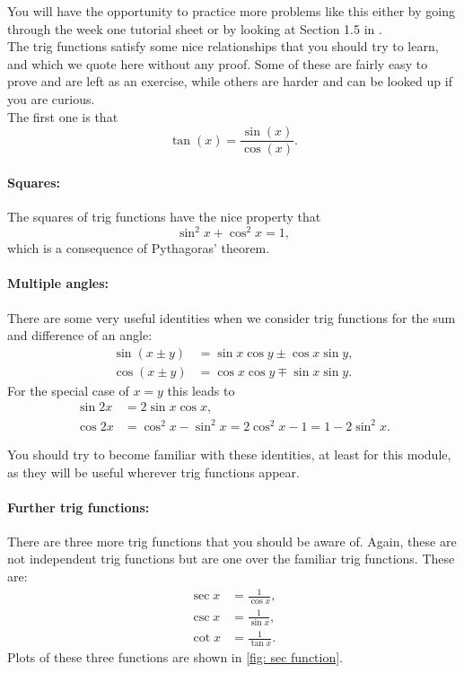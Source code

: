 You will have the opportunity to practice more problems like this either by going through the week one tutorial sheet or by looking at Section 1.5 in \citep{calcI}.\\

The trig functions satisfy some nice relationships that you should try to learn, and which we quote here without any proof. Some of these are fairly easy to prove and are left as an exercise, while others are harder and can be looked up if you are curious.\\

The first one is that 
\begin{equation*}
\tan(x)=\frac{\sin(x)}{\cos(x)}.
\end{equation*}

\paragraph{Squares:} The squares of trig functions have the nice property that
\begin{equation*}
\sin^{2}x+\cos^{2}x =1,
\end{equation*}
which is a consequence of Pythagoras' theorem.

\paragraph{Multiple angles:} There are some very useful identities when we consider trig functions for the sum and difference of an angle:
\begin{align*}
\sin\left(x\pm y\right)&=\sin x \cos y \pm \cos x \sin y,\\
\cos\left(x\pm y\right)&=\cos x \cos y \mp \sin x \sin y.
\end{align*}
For the special case of $x=y$ this leads to 
\begin{align*}
\sin 2x &= 2\sin x \cos x,\\
\cos 2x &=\cos^{2}x-\sin^{2}x = 2\cos^{2}x -1 =1-2\sin^{2}x.
\end{align*}

You should try to become familiar with these identities, at least for this module, as they will be useful wherever trig functions appear.\\

\paragraph{Further trig functions:} There are three more trig functions that you should be aware of. Again, these are not independent trig functions but are one over the familiar trig functions. These are:
\begin{align*}
\sec x &=\frac{1}{\cos x},\\
\csc x &=\frac{1}{\sin x},\\
\cot x &=\frac{1}{\tan x}.
\end{align*}
Plots of these three functions are shown in \cref{fig: sec function}.


